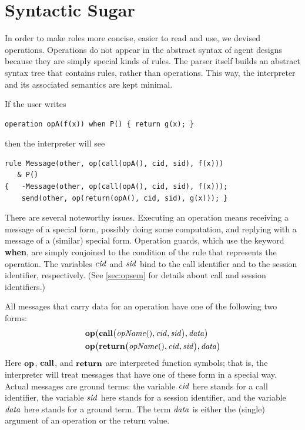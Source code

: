 \documentclass[a4paper,12pt,oneside,fleqn]{book} %
\begin{document}
\section{Syntactic Sugar}\label{sec:sugar} %

In order to make roles more concise, easier to read and use, we devised
operations. Operations do not appear in the abstract syntax of agent
designs because they are simply special kinds of rules. The parser itself
builds an abstract syntax tree that contains rules, rather than operations.
This way, the interpreter and its associated semantics are kept minimal.

\begin{example}
If the user writes
\begin{verbatim}
operation opA(f(x)) when P() { return g(x); }
\end{verbatim}
then the interpreter will see
\begin{verbatim}
rule Message(other, op(call(opA(), cid, sid), f(x)))
   & P()
{   -Message(other, op(call(opA(), cid, sid), f(x)));
    send(other, op(return(opA(), cid, sid), g(x))); }
\end{verbatim}
There are several noteworthy issues. Executing an operation means receiving
a message of a special form, possibly doing some computation, and replying
with a message of a (similar) special form. Operation guards, which use the
keyword {\bf when}, are simply conjoined to the condition of the rule that
represents the operation. The variables ${\it cid}$ and ${\it sid}$ bind to
the call identifier and to the session identifier, respectively. (See
\autoref{sec:opsem} for details about call and session identifiers.)
\end{example}

All messages that carry data for an operation have one of the following two
forms:
\begin{align}
  &{\bf op}\bigl(
    {\bf call}\bigl({\it opName}(), {\it cid}, {\it sid}\bigr),
    {\it data}
  \bigr)
\\
  &{\bf op}\bigl(
    {\bf return}\bigl({\it opName}(), {\it cid}, {\it sid}\bigr),
    {\it data}
  \bigr)
\end{align}
Here ${\bf op}$, $\bf call$, and $\bf return$ are interpreted function
symbols; that is, the interpreter will treat messages that have one of
these form in a special way. Actual messages are ground terms: the variable
$\it cid$ here stands for a call identifier, the variable $\it sid$ here
stands for a session identifier, and the variable $\it data$ here stands
for a ground term. The term $\it data$ is either the (single) argument of
an operation or the return value.
\end{document}
